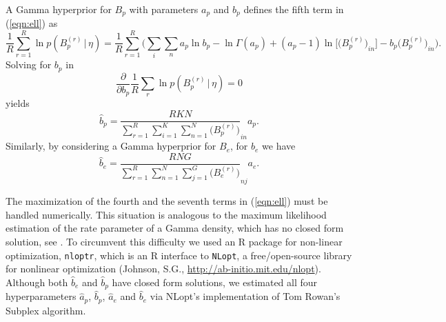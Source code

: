 \documentclass[11pt]{amsart}
\theoremstyle{definition}
\begin{document}
A Gamma hyperprior for $B_p$ with parameters $a_p$ and $b_p$ defines 
the fifth term in (\ref{eqn:ell}) as
\[
   \frac{1}{R}\sum_{r=1}^R \ln p(B_p^{(r)}\,|\, \eta)
  =
   \frac{1}{R}\sum_{r=1}^R \bigg(\sum_{i}\sum_{n} a_p\ln b_p  
    - \ln\Gamma(a_p) + 
   (a_p-1)\ln\big[\big(B_p^{(r)}\big)_{in}\big] -  
    b_p\big(B_p^{(r)}\big)_{in}\bigg).
\]
Solving for $b_p$ in 
\[
  \frac{\partial}{\partial b_p}
   \frac{1}{R}\sum_r \ln p(B_p^{(r)}\,|\, \eta) = 0
\]
yields
\[
   \hat b_p = \frac{RKN}{\sum_{r=1}^R \sum_{i=1}^K \sum_{n=1}^N 
     \big(B_p^{(r)}\big)}_{in}  a_p.
\]
Similarly, by considering a Gamma hyperprior for $B_e$, for $b_e$ we
have 
\[
   \hat b_e = \frac{RNG}{\sum_{r=1}^R \sum_{n=1}^N  \sum_{j=1}^G 
     \big(B_e^{(r)}\big)}_{nj}  a_e.
\]

The maximization of the fourth and the seventh terms in
(\ref{eqn:ell}) must be handled numerically. This situation is
analogous to the maximum likelihood estimation of the rate parameter
of a Gamma density, which has no closed form solution, see
\cite{CW}. To circumvent this difficulty we used an R package for
non-linear optimization, \texttt{nloptr}, which is an R interface to
\texttt{NLopt}, a free/open-source library for nonlinear optimization
(Johnson, S.G., \url{http://ab-initio.mit.edu/nlopt}).  Although both
$\hat b_e$ and $\hat b_p$ have closed form solutions, we estimated all
four hyperparameters $\hat a_p$, $\hat b_p$, $\hat a_e$ and $\hat b_e$
via NLopt's implementation of Tom Rowan's Subplex algorithm.
\end{document}
